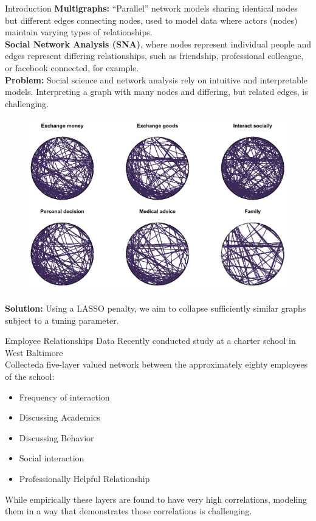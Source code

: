 \documentclass[final]{beamer}
\newlength{\onecolwid}
\begin{document}
\begin{frame}[t]
\begin{columns}[t]
\begin{column}{\onecolwid}
\begin{block}{Introduction}
  \textbf{Multigraphs:}
  ``Parallel'' network models sharing identical nodes but different
  edges connecting nodes, used to model data where
  actors (nodes) maintain varying types of relationships.\\
  \textbf{Social Network Analysis (SNA)}, where nodes represent
  individual people and edges represent differing relationships, such
  as friendship, professional colleague, or facebook connected, for
  example.\\
  \textbf{Problem:} Social science and network analysis rely
  on intuitive and interpretable models.  Interpreting a graph with
  many nodes and differing, but related edges, is challenging.
  \begin{figure}
    \centering
    \includegraphics{complexMultigraph.png}
  \end{figure}
  \textbf{Solution:} Using a LASSO penalty, we aim to collapse
  sufficiently similar graphs subject to a tuning parameter.
\end{block}

\begin{block}{Employee Relationships Data}
  Recently conducted study at a charter school in West Baltimore\\
  Collecteda five-layer valued network between the
  approximately eighty employees of the school:
  \begin{itemize}
  \item Frequency of interaction
  \item Discussing Academics
  \item Discussing Behavior
  \item Social interaction
  \item Professionally Helpful Relationship
  \end{itemize}
While empirically these layers are found to have very high
correlations, modeling them in a way that demonstrates those
correlations is challenging.
\end{block}



\end{column}
\end{columns}
\end{frame}
\end{document}
